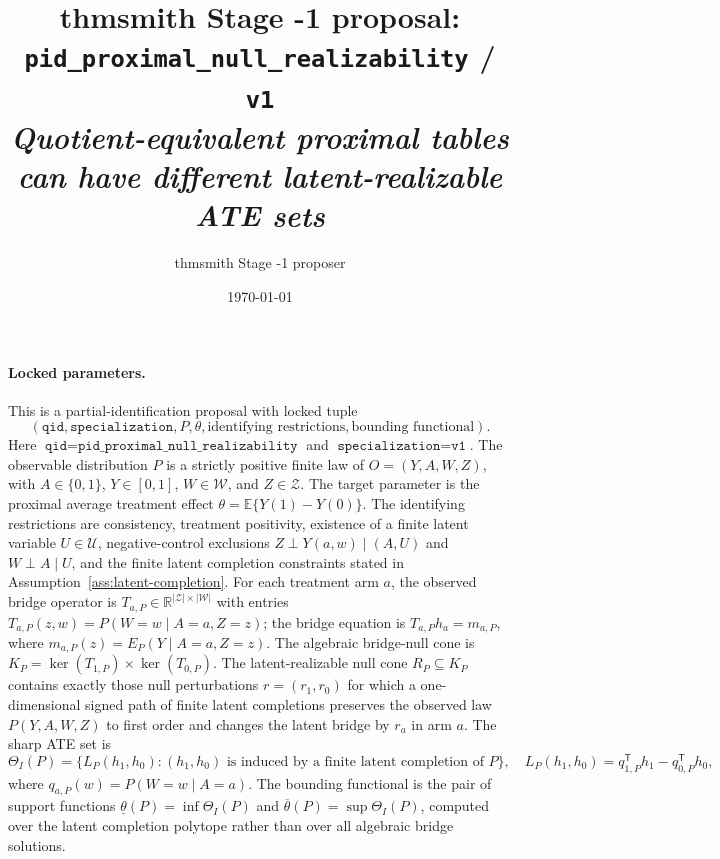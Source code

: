\documentclass[11pt]{article}
\title{thmsmith Stage -1 proposal: \texttt{pid\_proximal\_null\_realizability} / \texttt{v1}%
  \\ \large\textit{Quotient-equivalent proximal tables can have different latent-realizable ATE sets}}
\author{thmsmith Stage -1 proposer}
\date{\today}
\newcommand{\E}{\mathbb{E}}
\newcommand{\transpose}{\mathsf{T}}
\theoremstyle{definition}
\theoremstyle{plain}
\theoremstyle{remark}
\begin{document}
\maketitle


\paragraph{Locked parameters.}
This is a partial-identification proposal with locked tuple
\[
(\texttt{qid},\texttt{specialization},P,\theta,\text{identifying restrictions},\text{bounding functional}).
\]
Here \(\texttt{qid}=\texttt{pid\_proximal\_null\_realizability}\) and \(\texttt{specialization}=\texttt{v1}\). The observable distribution \(P\) is a strictly positive finite law of \(O=(Y,A,W,Z)\), with \(A\in\{0,1\}\), \(Y\in[0,1]\), \(W\in\mathcal W\), and \(Z\in\mathcal Z\). The target parameter is the proximal average treatment effect \(\theta=\E\{Y(1)-Y(0)\}\). The identifying restrictions are consistency, treatment positivity, existence of a finite latent variable \(U\in\mathcal U\), negative-control exclusions \(Z\perp Y(a,w)\mid(A,U)\) and \(W\perp A\mid U\), and the finite latent completion constraints stated in Assumption~\ref{ass:latent-completion}. For each treatment arm \(a\), the observed bridge operator is \(T_{a,P}\in\mathbb R^{|\mathcal Z|\times |\mathcal W|}\) with entries \(T_{a,P}(z,w)=P(W=w\mid A=a,Z=z)\); the bridge equation is \(T_{a,P}h_a=m_{a,P}\), where \(m_{a,P}(z)=E_P(Y\mid A=a,Z=z)\). The algebraic bridge-null cone is \(K_P=\ker(T_{1,P})\times\ker(T_{0,P})\). The latent-realizable null cone \(R_P\subseteq K_P\) contains exactly those null perturbations \(r=(r_1,r_0)\) for which a one-dimensional signed path of finite latent completions preserves the observed law \(P(Y,A,W,Z)\) to first order and changes the latent bridge by \(r_a\) in arm \(a\). The sharp ATE set is
\[
\Theta_I(P)=\{L_P(h_1,h_0): (h_1,h_0)\text{ is induced by a finite latent completion of }P\},
\quad
L_P(h_1,h_0)=q_{1,P}^{\transpose}h_1-q_{0,P}^{\transpose}h_0,
\]
where \(q_{a,P}(w)=P(W=w\mid A=a)\). The bounding functional is the pair of support functions \(\underline\theta(P)=\inf\Theta_I(P)\) and \(\overline\theta(P)=\sup\Theta_I(P)\), computed over the latent completion polytope rather than over all algebraic bridge solutions.
\end{document}

